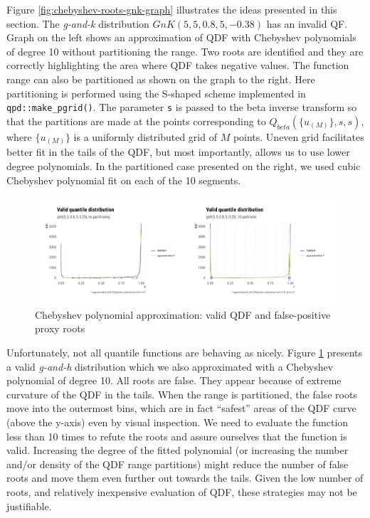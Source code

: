 \documentclass[
  12pt,
]{article}
\begin{document}
Figure \ref{fig:chebyshev-roots-gnk-graph} illustrates the ideas presented in this section. The \emph{g-and-k} distribution \(GnK(5,5,0.8,5,-0.38)\) has an invalid QF. Graph on the left shows an approximation of QDF with Chebyshev polynomials of degree 10 without partitioning the range. Two roots are identified and they are correctly highlighting the area where QDF takes negative values. The function range can also be partitioned as shown on the graph to the right. Here partitioning is performed using the S-shaped scheme implemented in \texttt{qpd::make\_pgrid()}. The parameter \texttt{s} is passed to the beta inverse transform so that the partitions are made at the points corresponding to \(Q_{beta}(\{u_{(M)} \}, s,s)\), where \(\{u_{(M)} \}\) is a uniformly distributed grid of \(M\) points. Uneven grid facilitates better fit in the tails of the QDF, but most importantly, allows us to use lower degree polynomials. In the partitioned case presented on the right, we used cubic Chebyshev polynomial fit on each of the 10 segments.

\begin{figure}

{\centering \includegraphics{ilbm_article_files/figure-latex/chebyshev-roots-gnh-graph-1} 

}

\caption{Chebyshev polynomial approximation: valid QDF and false-positive proxy roots}\label{fig:chebyshev-roots-gnh-graph}
\end{figure}

Unfortunately, not all quantile functions are behaving as nicely. Figure \ref{fig:chebyshev-roots-gnh-graph} presents a valid \emph{g-and-h} distribution which we also approximated with a Chebyshev polynomial of degree 10. All roots are false. They appear because of extreme curvature of the QDF in the tails. When the range is partitioned, the false roots move into the outermost bins, which are in fact ``safest'' areas of the QDF curve (above the y-axis) even by visual inspection. We need to evaluate the function less than 10 times to refute the roots and assure ourselves that the function is valid. Increasing the degree of the fitted polynomial (or increasing the number and/or density of the QDF range partitions) might reduce the number of false roots and move them even further out towards the tails. Given the low number of roots, and relatively inexpensive evaluation of QDF, these strategies may not be justifiable.

  
\end{document}
